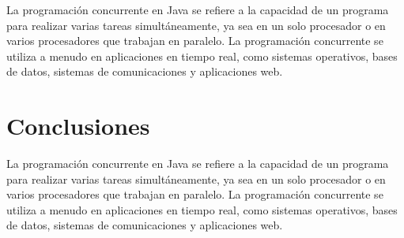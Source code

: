 La programación concurrente en Java se refiere a la capacidad de un programa para realizar varias tareas simultáneamente, ya sea en un solo procesador o en varios procesadores que trabajan en paralelo. La programación concurrente se utiliza a menudo en aplicaciones en tiempo real, como sistemas operativos, bases de datos, sistemas de comunicaciones y aplicaciones web.

\section{Conclusiones}

La programación concurrente en Java se refiere a la capacidad de un programa para realizar varias tareas simultáneamente, ya sea en un solo procesador o en varios procesadores que trabajan en paralelo. La programación concurrente se utiliza a menudo en aplicaciones en tiempo real, como sistemas operativos, bases de datos, sistemas de comunicaciones y aplicaciones web.


